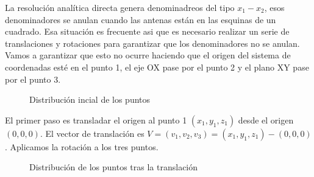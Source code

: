 La resolución analítica directa genera denominadreos del tipo $x_1 - x_2$, esos denominadores se anulan cuando las antenas están en las esquinas de un cuadrado. Esa situación es frecuente asi que es necesario realizar un serie de translaciones y rotaciones para garantizar que los denominadores no se anulan. Vamos a garantizar que esto no ocurre haciendo que el origen del sistema de coordenadas esté en el punto 1, el eje OX pase por el punto 2 y el plano XY pase por el punto 3. \newline

\begin{figure}[h!]
	\begin{center}
     	\end{center}
    	\caption{Distribución incial de los puntos}\label{fig:triang1}
\end{figure}


El primer paso es transladar el origen al punto 1 $(x_1,y_1,z_1)$ desde el origen $(0,0,0)$. El vector de translación es $V = (v_1,v_2,v_3) = (x_1,y_1,z_1) - (0, 0, 0)$. Aplicamos la rotación a los tres puntos. 

\begin{figure}[h!]
	\begin{center}
     	\end{center}
    	\caption{Distribución de los puntos tras la translación}\label{fig:triang2}
\end{figure}

